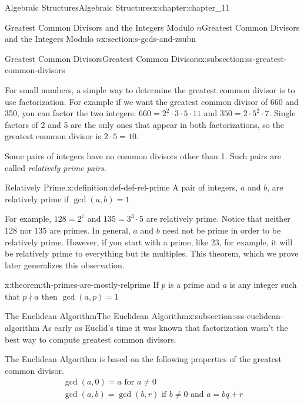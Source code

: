 \documentclass[oneside,10pt,]{book}
\numberwithin{equation}{section}
\begin{document}
\begin{chapterptx}{Algebraic Structures}{}{Algebraic Structures}{}{}{x:chapter:chapter_11}
\begin{sectionptx}{Greatest Common Divisors  and the Integers Modulo \(n\)}{}{Greatest Common Divisors  and the Integers Modulo \(n\)}{}{}{x:section:s-gcds-and-zsubn}
\begin{subsectionptx}{Greatest Common Divisors}{}{Greatest Common Divisors}{}{}{x:subsection:ss-greatest-common-divisors}
\par
For small numbers, a simple way to determine the greatest common divisor is to use factorization.  For example if we want the greatest common divisor of 660 and 350, you can factor the two integers:  \(660=2^2\cdot 3\cdot 5\cdot 11\) and \(350 = 2 \cdot 5^2\cdot 7\).     Single factors of 2 and 5 are the only ones that appear in both factorizations, so the greatest common divisor is \(2\cdot 5 =10\).%
\par
Some pairs of integers have no common divisors other than 1.  Such pairs are called \emph{relatively prime pairs}.%
\begin{definition}{Relatively Prime.}{x:definition:def-def-rel-prime}%
%
A pair of integers, \(a\) and \(b\), are relatively prime if \(\gcd(a, b)=1\)%
\end{definition}
For example, \(128=2^7\) and \(135=3^3\cdot 5\) are relatively prime.    Notice that neither 128 nor 135 are primes.   In general, \(a\) and \(b\) need not be prime in order to be relatively prime.  However, if you start with a prime, like 23, for example, it will be relatively prime to everything but its multiples.  This theorem, which we prove later generalizes this observation.%
\begin{theorem}{}{}{x:theorem:th-primes-are-mostly-relprime}%
If \(p\) is a prime and \(a\) is any integer such that \(p\nmid a\)  then \(\gcd(a, p) = 1\)%
\end{theorem}
\end{subsectionptx}
%
%
\typeout{************************************************}
\typeout{************************************************}
%
\begin{subsectionptx}{The Euclidean Algorithm}{}{The Euclidean Algorithm}{}{}{x:subsection:sss-euclidean-algorithm}
%
As early as Euclid's time it was known that factorization wasn't the best way to compute greatest common divisors.%
\par
The Euclidean Algorithm is based on the following properties of the greatest common divisor.%
\begin{gather}
\gcd(a,0)= a \textrm{  for  } a\neq 0\label{x:mrow:eq-euclid-basis}\\
\gcd(a, b)= \gcd(b, r)\textrm{   if } b\neq 0\textrm{   and }a = b q + r\label{x:mrow:eq-euclid-recursion}
\end{gather}
%
\par

\end{subsectionptx}
\end{sectionptx}
\end{chapterptx}
\end{document}
